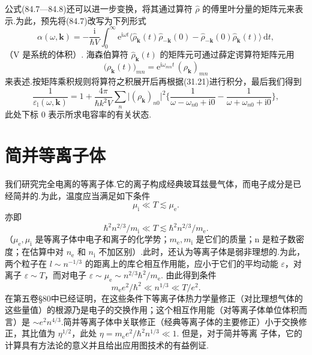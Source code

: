 公式(84.7—84.8)还可以进一步变换，将其通过算符 $\hat{\rho}$ 的傅里叶分量的矩阵元来表示.为此，预先将(84.7)改写为下列形式
\begin{equation}
  \alpha(\omega,\bm{k})=-\frac{\mathrm{i}}{\hbar V}\int_{0}^{\infty}\mathrm{e}^{\mathrm{i}\omega t}\bigl\langle\hat{\rho}_{\bm{k}}(t)\hat{\rho}_{-\bm{k}}(0)-\hat{\rho}_{-\bm{k}}(0)\hat{\rho}_{\bm{k}}(t)\bigr\rangle\,\mathrm{d}t,
\end{equation}
（V 是系统的体积）. 海森伯算符 $\hat{\rho}_{\bm{k}}(t)$ 的矩阵元可通过薛定谔算符矩阵元用
\begin{equation*}
  \bigl(\rho_{\bm{k}}(t)\bigr)_{mn}=\mathrm{e}^{\mathrm{i}\omega_{mn}t}\,(\rho_{\bm{k}})_{mn}
\end{equation*}
来表述.按矩阵乘积规则将算符之积展开后再根据(31.21)进行积分，最后我们得到
\begin{equation}
  \frac{1}{\varepsilon_{\mathrm{l}}(\omega,\bm{k})}=1+\frac{4\pi}{\hbar k^{2}V}\sum_{n}\bigl|(\rho_{\bm{k}})_{n0}\bigr|^{2}\biggl\{\frac{1}{\omega-\omega_{n0}+\mathrm{i}0}-\frac{1}{\omega+\omega_{n0}+\mathrm{i}0}\biggr\},
\end{equation}
此处下标 0 表示所求电容率的有关状态.

\section{简并等离子体}

我们研究完全电离的等离子体.它的离子构成经典玻耳兹曼气体，而电子成分是已经简并的.为此，温度应当满足如下条件
\begin{equation*}
  \mu_{\mathrm{i}}\ll T\lesssim\mu_{\mathrm{e}}.
\end{equation*}
亦即
\begin{equation}
  \hbar^{2}n^{2/3}/m_{\mathrm{i}}\ll T\lesssim\hbar^{2}n^{2/3}/m_{\mathrm{e}}.
\end{equation}
（$\mu_{\mathrm{e}},\mu_{\mathrm{i}}$ 是等离子体中电子和离子的化学势；$m_{\mathrm{e}},m_{\mathrm{i}}$ 是它们的质量；n 是粒子数密度；在估算中对 $n_{\mathrm{e}}$ 和 $n_{\mathrm{i}}$ 不加区别）.此时，还认为等离子体是弱非理想的.为此，两个粒子在 $l\sim n^{-1/3}$ 的距离上的库仑相互作用能，应小于它们的平均动能 $\varepsilon$，对离子 $\varepsilon\sim T$，而对电子 $\varepsilon\sim\mu_{\mathrm{e}}\sim n^{2/3}\hbar^{2}/m_{\mathrm{e}}$. 由此得到条件
\begin{equation}
  m_{\mathrm{e}}e^{2}/\hbar^{2}\ll n^{1/3}\ll T/e^{2}.
\end{equation}
在第五卷§80中已经证明，在这些条件下等离子体热力学量修正（对比理想气体的这些量值）的根源乃是电子的交换作用；这个相互作用能（对等离子体单位体积而言）是 $\sim e^{2}n^{4/3}$.简并等离子体中关联修正（经典等离子体的主要修正）小于交换修正，其比值为 $\eta^{1/2}$，此处 $\eta=m_{\mathrm{e}}e^{2}/\hbar^{2}n^{1/3}\ll 1$. 但是，对于简并等离
子体，它的计算具有方法论的意义并且给出应用图技术的有益例证.


